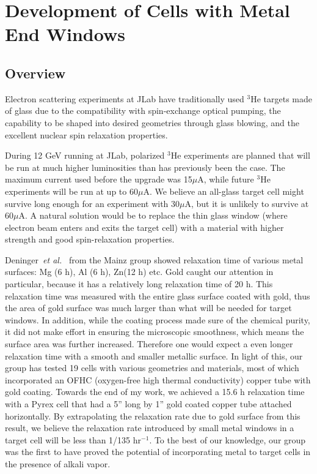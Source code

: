 \chapter{Development of Cells with Metal End Windows}
\label{chap5}

\section{Overview}

Electron scattering experiments at JLab have traditionally used $^{3}$He targets made of glass due to the compatibility with spin-exchange optical pumping, the capability to be shaped into desired geometries through glass blowing, and the excellent nuclear spin relaxation properties. 

During 12 GeV running at JLab, polarized $^3$He experiments are planned that will be run at much higher luminosities than has previously been the case. The maximum current used before the upgrade was 15$\mu$A, while future $^3$He experiments will be run at up to 60$\mu$A. We believe an all-glass target cell might survive long enough for an experiment with 30$\mu$A, but it is unlikely to survive at 60$\mu$A. A natural solution would be to replace the thin glass window (where electron beam enters and exits the target cell) with a material with higher strength and good spin-relaxation properties. 

Deninger~\emph{et al.}~\cite{Schmiedeskamp2006} from the Mainz group showed relaxation time of various metal surfaces: Mg (6 h), Al (6 h), Zn(12 h) etc. Gold caught our attention in particular, because it has a relatively long relaxation time of 20 h. This relaxation time was measured with the entire glass surface coated with gold, thus the area of gold surface was much larger than what will be needed for target windows. In addition, while the coating process made sure of the chemical purity, it did not make effort in ensuring the microscopic smoothness, which means the surface area was further increased. Therefore one would expect a even longer relaxation time with a smooth and smaller metallic surface. In light of this, our group has tested 19 cells with various geometries and materials, most of which incorporated an OFHC (oxygen-free high thermal conductivity) copper tube with gold coating. Towards the end of my work, we achieved a 15.6 h relaxation time with a Pyrex cell that had a 5'' long by 1'' gold coated copper tube attached horizontally. By extrapolating the relaxation rate due to gold surface from this result, we believe the relaxation rate introduced by small metal windows in a target cell will be less than 1/135 hr$^{-1}$. To the best of our knowledge, our group was the first to have proved the potential of incorporating metal to target cells in the presence of alkali vapor.


